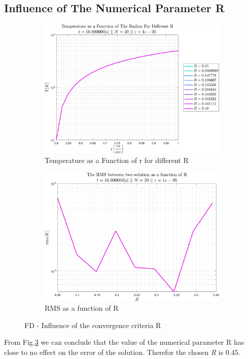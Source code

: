 \documentclass[11pt, a4paper]{article}
\begin{document}
\subsection{Influence of The Numerical Parameter R}
\begin{figure}[H]
    \centering
    \begin{subfigure}[c]{0.49\textwidth}
        \centering
        \includegraphics[width=\textwidth]{images/Influenc of R.png}
        \caption{Temperature as a Function of r for different R}
        \label{fig: T vs r for diff R}
    \end{subfigure}
    \hfill
    \begin{subfigure}[c]{0.49\textwidth}
        \centering
        \includegraphics[width=\textwidth]{images/Influenc of R - error.png}
        \caption{RMS as a function of R}
        \label{fig: RMS vs R}
    \end{subfigure}
    \caption{FD - Influence of the convergence criteria R}
    \label{fig: Influence of R}
\end{figure}
From Fig.\ref{fig: Influence of R} we can conclude that the value of the numerical parameter R has close to no effect on the error of the solution. Therefor the chosen \emph{R} is 0.45.
\end{document}
